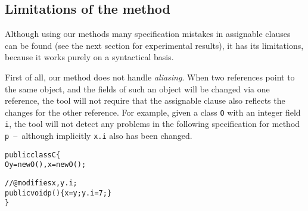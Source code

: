 \documentclass[a4paper]{llncs}
\begin{document}


\subsection{Limitations of the method}
Although using our methods many specification mistakes in assignable
clauses can be found (see the next section for experimental results),
it has its limitations, because it works purely on a syntactical
basis.

First of all, our method does not handle \emph{aliasing}. When two
references point to the same object, and the fields of such an object
will be changed via one reference, the tool will not require that the
assignable clause also reflects the changes for the other
reference. For example, given a class \texttt{O} with an integer field 
\texttt{i}, the tool will not detect any problems in the following
specification for method \texttt{p}~--~although implicitly
\texttt{x.i} also has been changed.

\begin{alltt}
public class C\verb!{!
  O y = new O(), x = new O();    

  //@ modifies x, y.i;
  public void p()\verb!{!x = y; y.i = 7;\verb!}!    
\verb!}!
\end{alltt}

\end{document}

